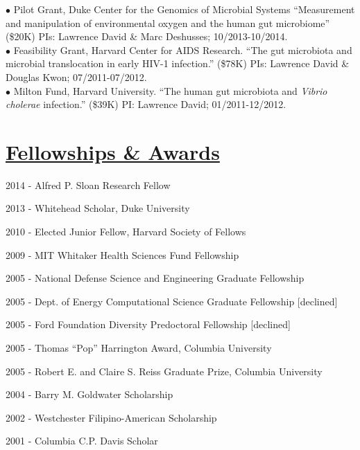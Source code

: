 \documentclass[overlapped,line,11pt]{res}
\newenvironment{list1}{
  \begin{list}{\ding{113}}{%
      \setlength{\itemsep}{0in}
      \setlength{\parsep}{0in} \setlength{\parskip}{0in}
      \setlength{\topsep}{0in} \setlength{\partopsep}{0in} 
      \setlength{\leftmargin}{0.17in}}}{\end{list}}
\begin{document}
\begin{resume}
\vspace{-10mm}
\hangindent=0.5in $\bullet$\hspace{.1in} Pilot Grant, Duke Center for
the Genomics of Microbial Systems ``Measurement and manipulation of
environmental oxygen and the human gut microbiome'' (\$20K) PIs:
Lawrence David \& Marc Deshusses; 10/2013-10/2014. \\

\vspace{-10mm}
\hangindent=0.5in $\bullet$\hspace{.1in} Feasibility Grant, Harvard
Center for AIDS Research. ``The gut microbiota and microbial
translocation in early HIV-1 infection.'' (\$78K) PIs: Lawrence David
\& Douglas Kwon; 07/2011-07/2012. \\

\vspace{-10mm}
\hangindent=0.5in $\bullet$\hspace{.1in} Milton Fund, Harvard
University. ``The human gut microbiota and \emph{Vibrio cholerae}
infection.'' (\$39K) PI: Lawrence David; 01/2011-12/2012. 

\section{\underline{\sc Fellowships \& Awards}} 
\vspace{.25in}
\begin{list1}
\item[] 2014 - Alfred P. Sloan Research Fellow %
\item[] 2013 - Whitehead Scholar, Duke University%
\item[] 2010 - Elected Junior Fellow, Harvard Society of Fellows%
\item[] 2009 - MIT Whitaker Health Sciences Fund Fellowship %
\item[] 2005 - National Defense Science and Engineering Graduate
  Fellowship %
\item[] 2005 - Dept. of Energy Computational Science Graduate Fellowship
  [declined] %
\item[] 2005 - Ford Foundation Diversity Predoctoral Fellowship
  [declined] %
\item[] 2005 - Thomas ``Pop'' Harrington Award, Columbia University
\item[] 2005 - Robert E. and Claire S. Reiss Graduate Prize, Columbia University
\item[] 2004 - Barry M. Goldwater Scholarship
\item[] 2002 - Westchester Filipino-American Scholarship
\item[] 2001 - Columbia C.P. Davis Scholar
\end{list1}


\end{resume}
\end{document}
